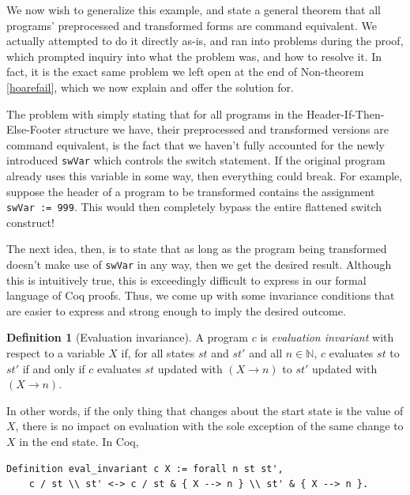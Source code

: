 \documentclass[12pt,notitlepage]{report}
\theoremstyle{plain}
\theoremstyle{definition}
\newtheorem{defin}[theo]{Definition}
\newcommand\N{\mathbb{N}}
\numberwithin{equation}{section}
\begin{document}
We now wish to generalize this example, and state a general theorem that all programs' preprocessed and transformed forms are command equivalent.  We actually attempted to do it directly as-is, and ran into problems during the proof, which prompted inquiry into what the problem was, and how to resolve it.  In fact, it is the exact same problem we left open at the end of Non-theorem \ref{hoarefail}, which we now explain and offer the solution for.

\par The problem with simply stating that for all programs in the Header-If-Then-Else-Footer structure we have, their preprocessed and transformed versions are command equivalent, is the fact that we haven't fully accounted for the newly introduced \verb$swVar$ which controls the switch statement.  If the original program already uses this variable in some way, then everything could break.  For example, suppose the header of a program to be transformed contains the assignment \verb$swVar := 999$.  This would then completely bypass the entire flattened switch construct!

\par The next idea, then, is to state that as long as the program being transformed doesn't make use of \verb$swVar$ in any way, then we get the desired result.  Although this is intuitively true, this is exceedingly difficult to express in our formal language of Coq proofs.  Thus, we come up with some invariance conditions that are easier to express and strong enough to imply the desired outcome.

\begin{defin}[Evaluation invariance]
A program $c$ is \emph{evaluation invariant} with respect to a variable $X$ if, for all states $st$ and $st'$ and all $n \in \N$, $c$ evaluates $st$ to $st'$ if and only if $c$ evaluates $st$ updated with $(X \longrightarrow n)$ to $st'$ updated with $(X\longrightarrow n)$.
\par In other words, if the only thing that changes about the start state is the value of $X$, there is no impact on evaluation with the sole exception of the same change to $X$ in the end state.  In Coq,
\begin{verbatim}
Definition eval_invariant c X := forall n st st', 
    c / st \\ st' <-> c / st & { X --> n } \\ st' & { X --> n }.
\end{verbatim}
\end{defin}
\end{document}
